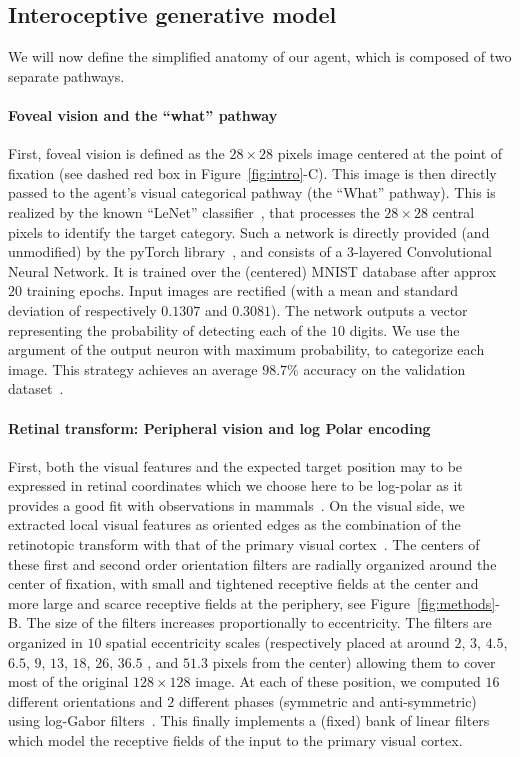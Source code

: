 \subsection{Interoceptive generative model}
%
We will now define the simplified anatomy of our agent, which is composed of two separate pathways.
\paragraph{Foveal vision and the ``what'' pathway}
First, foveal vision is defined as the $28\times 28$ pixels image centered at the point of fixation (see dashed red box in Figure~\ref{fig:intro}-C). This image is then directly passed to the agent's visual categorical pathway (the ``What'' pathway). This is realized by the known ``LeNet'' classifier~\citep{Lecun1998}, that processes the $28 \times 28$ central pixels to identify the target category. Such a network is directly provided (and unmodified) by the pyTorch library~\citep{Paszke17}, and consists of a 3-layered Convolutional Neural Network. It is trained over the (centered) MNIST database after approx $20$ training epochs. Input images are rectified (with a mean and standard deviation of respectively $0.1307$ and $0.3081$). The network outputs a vector representing the probability of detecting each of the $10$ digits. We use the argument of the output neuron with maximum probability, to categorize each image. This strategy achieves an average $98.7\%$ accuracy on the validation dataset~\citep{Lecun1998}. %

\paragraph{Retinal transform: Peripheral vision and log Polar encoding}
First, both the visual features and the expected target position may to be expressed in retinal coordinates which we choose here to be log-polar as it provides a good fit with observations in mammals~\citep{Traver10}. On the visual side, we extracted local visual features as oriented edges  as the combination of the retinotopic transform with that of the primary visual cortex~\citep{Fischer2007a}. The centers of these first and second order orientation filters are radially organized around the center of fixation, with small and tightened receptive fields at the center and more large and scarce receptive fields at the periphery, see  Figure~\ref{fig:methods}-B. The size of the filters increases proportionally to eccentricity. The filters are organized in $10$ spatial eccentricity scales (respectively placed at around $2$, $3$, $4.5$, $6.5$, $9$, $13$, $18$, $26$, $36.5$ , and $51.3$ pixels from the center) allowing them to cover most of the original $128 \times 128$ image.  At each of these position, we computed $16$ different orientations and $2$ different phases (symmetric and anti-symmetric) using log-Gabor filters~\citep{Fischer2007a}. This finally implements a (fixed) bank of linear filters which model the receptive fields of the input to the primary visual cortex.

